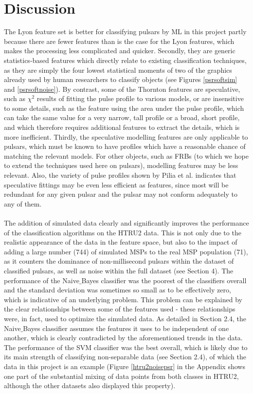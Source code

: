 \documentclass[12pt]{article}
\begin{document}
\section{Discussion}
The Lyon feature set is better for classifying pulsars by ML in this project partly because there are fewer features than is the case for the Lyon features, which makes the processing less complicated and quicker. Secondly, they are generic statistics-based features which directly relate to existing classification techniques, as they are simply the four lowest statistical moments of two of the graphics already used by human researchers to classify objects (see Figures \ref{psrsoftsim} and \ref{psrsoftnoise}). By contrast, some of the Thornton features are speculative, such as  $\chi^{2}$ results of fitting the pulse profile to various models, or are insensitive to some details, such as the feature using the area under the pulse profile, which can take the same value for a very narrow, tall profile or a broad, short profile, and which therefore requires additional features to extract the details, which is more inefficient. Thirdly, the speculative modelling features are only applicable to  pulsars, which must be known to have profiles which have a reasonable chance of matching the relevant models. For other objects, such as FRBs (to which we hope to extend the techniques used here on pulsars), modelling features may be less relevant. Also, the variety of pulse profiles shown by Pilia et al. \cite{pilia2016wide} indicates that speculative fittings may be even less efficient as features, since most will be redundant for any given pulsar and the pulsar may not conform adequately to any of them.
\paragraph{}
The addition of simulated data clearly and significantly improves the performance of the classification algorithms on the HTRU2 data. This is not only due to the realistic appearance of the data in the feature space, but also to the impact of adding a large number (744) of simulated MSPs to the real MSP population (71), as it counters the dominance of non-millisecond pulsars within the dataset of classified pulsars, as well as noise within the full dataset (see Section 4). The performance of the Naive$\_$Bayes classifier was the poorest of the classifiers overall and the standard deviation was sometimes so small as to be effectively zero, which is indicative of an underlying problem. This problem can be explained by the clear relationships between some of the features used - these relationships were, in fact, used to optimize the simulated data. As detailed in Section 2.4, the Naive$\_$Bayes classifier assumes the features it uses to be independent of one another, which is clearly contradicted by the aforementioned trends in the data. The performance of the SVM classifier was the best overall, which is likely due to its main strength of classifying non-separable data (see Section 2.4), of which the data in this project is an example (Figure \ref{htru2noisepsr} in the Appendix shows one part of the substantial mixing of data points from both classes in HTRU2, although the other datasets also displayed this property).
\end{document}
